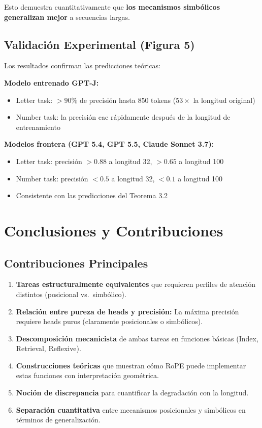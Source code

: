 \documentclass[conference]{IEEEtran}
\begin{document}
Esto demuestra cuantitativamente que \textbf{los mecanismos simb\'olicos generalizan mejor} a secuencias largas.

\subsection{Validaci\'on Experimental (Figura 5)}

Los resultados confirman las predicciones te\'oricas:

\textbf{Modelo entrenado GPT-J:}
\begin{itemize}
    \item Letter task: $>90\%$ de precisi\'on hasta 850 tokens ($53\times$ la longitud original)
    \item Number task: la precisi\'on cae r\'apidamente despu\'es de la longitud de entrenamiento
\end{itemize}

\textbf{Modelos frontera (GPT 5.4, GPT 5.5, Claude Sonnet 3.7):}
\begin{itemize}
    \item Letter task: precisi\'on $>0.88$ a longitud 32, $>0.65$ a longitud 100
    \item Number task: precisi\'on $<0.5$ a longitud 32, $<0.1$ a longitud 100
    \item Consistente con las predicciones del Teorema 3.2
\end{itemize}

\section{Conclusiones y Contribuciones}

\subsection{Contribuciones Principales}

\begin{enumerate}
    \item \textbf{Tareas estructuralmente equivalentes} que requieren perfiles de atenci\'on distintos (posicional vs.~simb\'olico).
    \item \textbf{Relaci\'on entre pureza de heads y precisi\'on:} La m\'axima precisi\'on requiere heads puros (claramente posicionales o simb\'olicos).
    \item \textbf{Descomposici\'on mecanicista} de ambas tareas en funciones b\'asicas (Index, Retrieval, Reflexive).
    \item \textbf{Construcciones te\'oricas} que muestran c\'omo RoPE puede implementar estas funciones con interpretaci\'on geom\'etrica.
    \item \textbf{Noci\'on de discrepancia} para cuantificar la degradaci\'on con la longitud.
    \item \textbf{Separaci\'on cuantitativa} entre mecanismos posicionales y simb\'olicos en t\'erminos de generalizaci\'on.
\end{enumerate}
\end{document}
